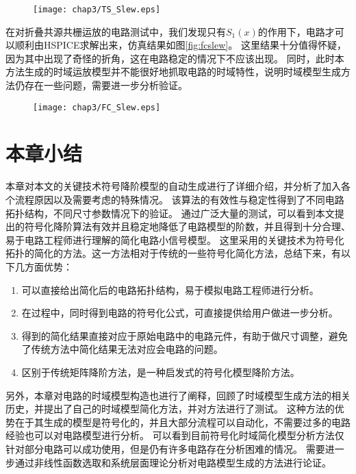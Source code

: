 \begin{figure}[!htp]
	\centering
	\texttt{[image: chap3/TS\_Slew.eps]}
\end{figure}

在对折叠共源共栅运放的电路测试中，我们发现只有$S_1\left(x\right)$的作用下，电路才可以顺利由HSPICE求解出来，仿真结果如图\ref{fig:fcslew}。
这里结果十分值得怀疑，因为其中出现了奇怪的折角，这在电路稳定的情况下不应该出现。
同时，此时本方法生成的时域运放模型并不能很好地抓取电路的时域特性，说明时域模型生成方法仍存在一些问题，需要进一步分析验证。

\begin{figure}[!htp]
	\centering
	\texttt{[image: chap3/FC\_Slew.eps]}
\end{figure}

\section{本章小结}
\label{sec:simp:con}

本章对本文的关键技术符号降阶模型的自动生成进行了详细介绍，并分析了加入各个流程原因以及需要考虑的特殊情况。
该算法的有效性与稳定性得到了不同电路拓扑结构，不同尺寸参数情况下的验证。
通过广泛大量的测试，可以看到本文提出的符号化降阶算法有效并且稳定地降低了电路模型的阶数，并且得到十分合理、易于电路工程师进行理解的简化电路小信号模型。
这里采用的关键技术为符号化拓扑的简化的方法。这一方法相对于传统的一些符号化简化方法，总结下来，有以下几方面优势：

\begin{enumerate}[label=\emph{\alph*})]
	\item 可以直接给出简化后的电路拓扑结构，易于模拟电路工程师进行分析。
	\item 在过程中，同时得到电路的符号化公式，可直接提供给用户做进一步分析。
	\item 得到的简化结果直接对应于原始电路中的电路元件，有助于做尺寸调整，避免了传统方法中简化结果无法对应会电路的问题。
	\item 区别于传统矩阵降阶方法，是一种启发式的符号化模型降阶方法。
\end{enumerate}

另外，本章对电路的时域模型构造也进行了阐释，回顾了时域模型生成方法的相关历史，并提出了自己的时域模型简化方法，并对方法进行了测试。
这种方法的优势在于其生成的模型是符号化的，并且大部分流程可以自动化，不需要过多的电路经验也可以对电路模型进行分析。
可以看到目前符号化时域简化模型分析方法仅针对部分电路可以成功使用，但是仍有许多电路存在分析困难的情况。
需要进一步通过非线性函数选取和系统层面理论分析对电路模型生成的方法进行论证。
